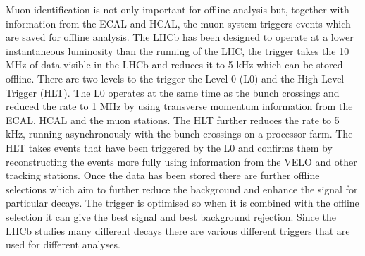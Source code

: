 Muon identification is not only important for offline analysis but, together with information from the ECAL and HCAL, the muon system triggers events which are saved for offline analysis. 
The LHCb has been designed to operate at a lower instantaneous luminosity than the running of the LHC, the trigger takes the 10 MHz of data visible in the LHCb and reduces it to 5 kHz which can 
be stored offline. There are two levels to the trigger the Level 0 (L0) and the High Level Trigger (HLT). The L0 operates at the same time as the bunch crossings and reduced the rate to 1 MHz
by using transverse momentum information from the ECAL, HCAL and the muon stations. The HLT further reduces the rate to 5 kHz, running asynchronously with the bunch crossings on a processor farm. The HLT
takes events that have been triggered by the L0 and confirms them by reconstructing the events more fully using information from the VELO and other tracking stations. Once the data has been stored there are further offline selections
which aim to further reduce the background and enhance the signal for particular decays.  The trigger is optimised so when it is combined with the offline selection it can give the best signal and best background rejection. Since the LHCb studies many different decays there are various different
triggers that are used for different analyses. 







